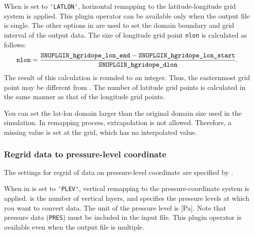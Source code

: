 When  is set to \verb|'LATLON'|, horizontal remapping to the latitude-longitude grid system is applied.
This plugin operator can be available only when the output file is single.
The other options in  are used to set the domain boundary and grid interval of the output data.
The size of longitude grid point \verb|nlon| is calculated as follows:
\begin{eqnarray}
  \nmitemeq{nlon} = \frac{\nmitemeq{SNOPLGIN_hgridope_lon_end} - \nmitemeq{SNOPLGIN_hgridope_lon_start} }{\nmitemeq{SNOPLGIN_hgridope_dlon}} \nonumber.
\end{eqnarray}
\noindent
The result of this calculation is rounded to an integer.
Thus, the easternmost grid point may be different from .
The number of latitude grid points is calculated in the same manner as that of the longitude grid points.

You can set the lat-lon domain larger than the original domain size used in the simulation.
In remapping process, extrapolation is not allowed.
Therefore, a missing value is set at the grid, which has no interpolated value.


\subsubsection{Regrid data to pressure-level coordinate}

The settings for regrid of data on pressure-level coordinate are specified by .
%

When  in  is set to \verb|'PLEV'|, vertical remapping to the pressure-coordinate system is applied.
 is the number of vertical layers, and  specifies the pressure levels at which you want to convert data.
The unit of the pressure level is [Pa].
Note that pressure data (\verb|PRES|) must be included in the input file.
This plugin operator is available even when the output file is multiple.
